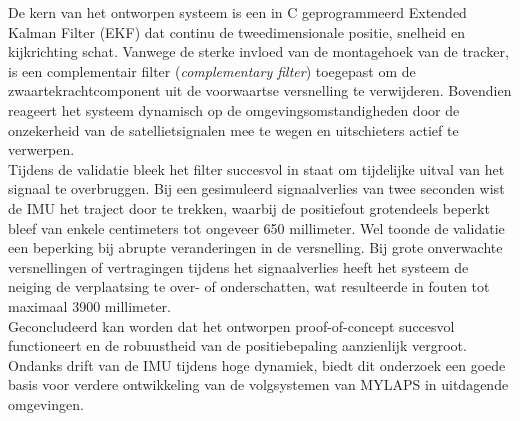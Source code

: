 De kern van het ontworpen systeem is een in C geprogrammeerd Extended Kalman Filter (EKF) dat continu de tweedimensionale positie, snelheid en kijkrichting schat. Vanwege de sterke invloed van de montagehoek van de tracker, is een complementair filter (\textit{complementary filter}) toegepast om de zwaartekrachtcomponent uit de voorwaartse versnelling te verwijderen. Bovendien reageert het systeem dynamisch op de omgevingsomstandigheden door de onzekerheid van de satellietsignalen mee te wegen en uitschieters actief te verwerpen. \\

Tijdens de validatie bleek het filter succesvol in staat om tijdelijke uitval van het signaal te overbruggen. Bij een gesimuleerd signaalverlies van twee seconden wist de IMU het traject door te trekken, waarbij de positiefout grotendeels beperkt bleef van enkele centimeters tot ongeveer 650 millimeter. Wel toonde de validatie een beperking bij abrupte veranderingen in de versnelling. Bij grote onverwachte versnellingen of vertragingen tijdens het signaalverlies heeft het systeem de neiging de verplaatsing te over- of onderschatten, wat resulteerde in fouten tot maximaal 3900 millimeter. \\

Geconcludeerd kan worden dat het ontworpen proof-of-concept succesvol functioneert en de robuustheid van de positiebepaling aanzienlijk vergroot. Ondanks drift van de IMU tijdens hoge dynamiek, biedt dit onderzoek een goede basis voor verdere ontwikkeling van de volgsystemen van MYLAPS in uitdagende omgevingen.

\newpage